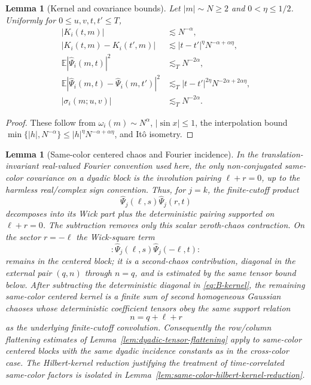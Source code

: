 \documentclass[10pt]{amsart}
\numberwithin{equation}{section}
\theoremstyle{plain}
\newtheorem{lemma}[theorem]{Lemma}
\theoremstyle{definition}
\theoremstyle{remark}
\newcommand{\E}{\mathbb{E}}
\begin{document}
\begin{lemma}[Kernel and covariance bounds]\label{lem:kernel-cov-bounds}
Let $|m|\sim N\ge2$ and $0<\eta\le1/2$.  Uniformly for $0\le u,v,t,t'\le T$,
\begin{align}
 |K_i(t,m)|&\lesssim N^{-\alpha}, \\
 |K_i(t,m)-K_i(t',m)|&\lesssim |t-t'|^\eta N^{-\alpha+\alpha\eta}, \\
 \E|\widehat\Psi_i(m,t)|^2&\lesssim_T N^{-2\alpha}, \\
 \E|\widehat\Psi_i(m,t)-\widehat\Psi_i(m,t')|^2&\lesssim_T |t-t'|^{2\eta}N^{-2\alpha+2\alpha\eta}, \\
 |\sigma_i(m;u,v)|&\lesssim_T N^{-2\alpha}.
\end{align}
\end{lemma}

\begin{proof}
These follow from $\omega_i(m)\sim N^\alpha$, $|\sin x|\le1$, the interpolation bound $\min\{|h|,N^{-\alpha}\}\le |h|^\eta N^{-\alpha+\alpha\eta}$, and It\^o isometry.
\end{proof}



\begin{lemma}[Same-color centered chaos and Fourier incidence]\label{lem:same-color-centered-chaos-model}
In the translation-invariant real-valued Fourier convention used here, the only non-conjugated same-color covariance on a dyadic block is the involution pairing $\ell+r=0$, up to the harmless real/complex sign convention.  Thus, for $j=k$, the finite-cutoff product
\[
        \widehat\Psi_j(\ell,s)\widehat\Psi_j(r,t)
\]
decomposes into its Wick part plus the deterministic pairing supported on $\ell+r=0$.  The subtraction removes only this scalar zeroth-chaos contraction.  On the sector $r=-\ell$ the Wick-square term
\[
        :\widehat\Psi_j(\ell,s)\widehat\Psi_j(-\ell,t):
\]
remains in the centered block; it is a second-chaos contribution, diagonal in the external pair $(q,n)$ through $n=q$, and is estimated by the same tensor bound below.  After subtracting the deterministic diagonal in \eqref{eq:B-kernel}, the remaining same-color centered kernel is a finite sum of second homogeneous Gaussian chaoses whose deterministic coefficient tensors obey the same support relation
\[
        n=q+\ell+r
\]
as the underlying finite-cutoff convolution.  Consequently the row/column flattening estimates of Lemma~\ref{lem:dyadic-tensor-flattening} apply to same-color centered blocks with the same dyadic incidence constants as in the cross-color case.  The Hilbert-kernel reduction justifying the treatment of time-correlated same-color factors is isolated in Lemma~\ref{lem:same-color-hilbert-kernel-reduction}.
\end{lemma}
\end{document}
